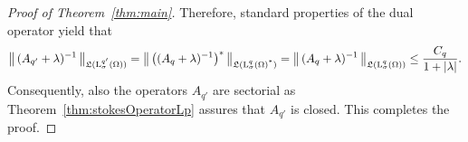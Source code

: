 \begin{proof}[Proof of Theorem~\ref{thm:main}]
  Therefore, standard properties of the dual operator yield that
  \begin{align*}
    \big\| \, (A_{q'} + \lambda)^{-1} \, \big\|_{\Li(\Ell^{q'}_\sigma(\Omega))}
    = \big\|\, \big(( A_q + \lambda)^{-1}\big)^* \, \big\|_{\vphantom{\Li(\Ell^{q'}_\sigma(\Omega))}\Li(\Ell^{q}_\sigma(\Omega)^{\stackrel{*}{\phantom{ }}})}
    = \big\| \, (A_q + \lambda)^{-1} \, \big\|_{\vphantom{\Li(\Ell^{q'}_\sigma(\Omega))} \Li(\Ell^q_\sigma(\Omega))}
    \leq \frac{C_q}{1 + |\lambda|}.
  \end{align*}
  Consequently, also the operators $A_{q'}$ are sectorial as Theorem~\ref{thm:stokesOperatorLp} assures that $A_{q'}$ is closed.
  This completes the proof.
\end{proof}

